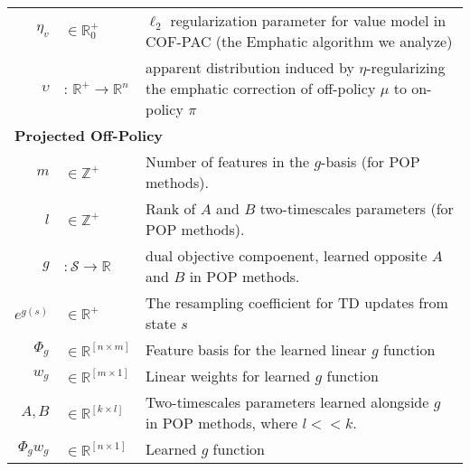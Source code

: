\begin{longtable}{rl p{4in}}
	\\  $\eta_v$ & $\in \mathbb R^+_0$ & $\ell_2$ regularization parameter for value model in COF-PAC (the Emphatic algorithm we analyze)
	\\  $\upsilon$ & : $\mathbb R^+ \to \mathbb R^{n}$ & apparent distribution induced by $\eta$-regularizing the emphatic correction of off-policy $\mu$ to on-policy $\pi$
	\\ \hline\hline
	\multicolumn{3}{l}{\textbf{Projected Off-Policy}}
	\\ \hline
	$m$                        & $\in\mathbb Z^+$ & Number of features in the $g$-basis (for POP methods).
	\\  $l$ & $\in\mathbb Z^+$ & Rank of $A$ and $B$ two-timescales parameters (for POP methods).
	\\ $g$                        & $: \mathcal S \to \mathbb R$ & dual objective compoenent, learned opposite $A$ and $B$ in POP methods.
	\\  $e^{g(s)}$ & $\in \mathbb R^+$ & The resampling coefficient for TD updates from state $s$
	\\  $\Phi_g$ & $\in \mathbb R^{[n\times m]}$ & Feature basis for the learned linear $g$ function
	\\  $w_g$ & $\in \mathbb R^{[m\times 1]}$ & Linear weights for learned $g$ function
	\\  $A, B$ & $\in \mathbb R^{[k\times l]}$ & Two-timescales parameters learned alongside $g$ in POP methods, where $l << k$.
	\\  $\Phi_g w_g$ & $\in \mathbb R^{[n\times 1]}$ & Learned $g$ function
	\\ \hline\hline
\end{longtable}
